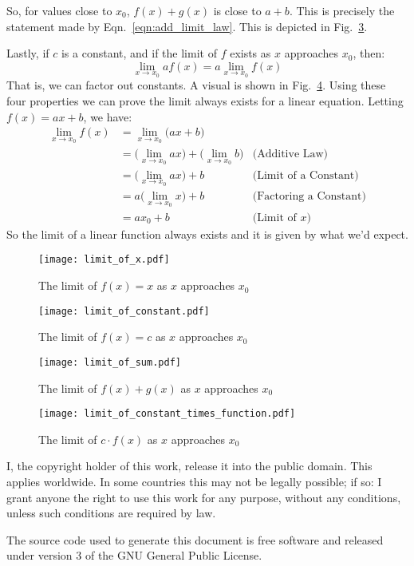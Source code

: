 \documentclass{article}
\begin{document}
    So, for values close to $x_{0}$, $f(x)+g(x)$ is close to $a+b$. This is
    precisely the statement made by Eqn.~\ref{eqn:add_limit_law}. This is
    depicted in Fig.~\ref{fig:limit_of_sum}.
    \par\hfill\par
    Lastly, if $c$ is a constant, and if the limit of $f$ exists as $x$
    approaches $x_{0}$, then:
    \begin{equation}
        \lim_{x\rightarrow{x}_{0}}af(x)=a\lim_{x\rightarrow{x}_{0}}f(x)
    \end{equation}
    That is, we can factor out constants. A visual is shown in
    Fig.~\ref{fig:limit_of_constant_times_function}. Using these four
    properties we can prove the limit always exists for a linear equation.
    Letting $f(x)=ax+b$, we have:
    \begin{align}
        \lim_{x\rightarrow{x}_{0}}f(x)
        &=\lim_{x\rightarrow{x}_{0}}\big(ax+b\big)\\
        &=\Big(\lim_{x\rightarrow{x}_{0}}ax\Big)
            +\Big(\lim_{x\rightarrow{x}_{0}}b\Big)
            &\text{(Additive Law)}\\
        &=\Big(\lim_{x\rightarrow{x}_{0}}ax\Big)+b
            &\text{(Limit of a Constant)}\\
        &=a\Big(\lim_{x\rightarrow{x}_{0}}x\Big)+b
            &\text{(Factoring a Constant)}\\
        &=ax_{0}+b
            &\text{(Limit of $x$)}
    \end{align}
    So the limit of a linear function always exists and it is given by what
    we'd expect.
    \begin{figure}
        \centering
        \texttt{[image: limit\_of\_x.pdf]}
        \caption{The limit of $f(x)=x$ as $x$ approaches $x_{0}$}
        \label{fig:lim_f_of_x_equals_x}
    \end{figure}
    \begin{figure}
        \centering
        \texttt{[image: limit\_of\_constant.pdf]}
        \caption{The limit of $f(x)=c$ as $x$ approaches $x_{0}$}
        \label{fig:limit_of_constant}
    \end{figure}
    \begin{figure}
        \centering
        \texttt{[image: limit\_of\_sum.pdf]}
        \caption{The limit of $f(x)+g(x)$ as $x$ approaches $x_{0}$}
        \label{fig:limit_of_sum}
    \end{figure}
    \begin{figure}
        \centering
        \texttt{[image: limit\_of\_constant\_times\_function.pdf]}
        \caption{The limit of $c\cdot{f}(x)$ as $x$ approaches $x_{0}$}
        \label{fig:limit_of_constant_times_function}
    \end{figure}
    \newpage
    I, the copyright holder of this work, release it into the public domain.
    This applies worldwide. In some countries this may not be legally possible;
    if so: I grant anyone the right to use this work for any purpose, without
    any conditions, unless such conditions are required by law.
    \par\hfill\par
    The source code used to generate this document is free software and released
    under version 3 of the GNU General Public License.
\end{document}
